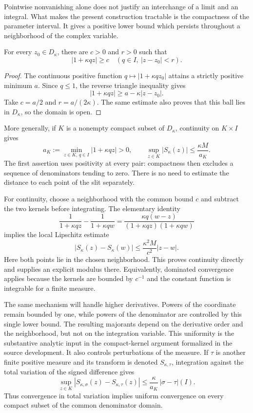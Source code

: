 \label{res:compact-control}
Pointwise nonvanishing alone does not justify an interchange of a limit
and an integral. What makes the present construction tractable is the
compactness of the parameter interval. It gives a positive lower bound
which persists throughout a neighborhood of the complex variable.

\begin{lemma}
For every $z_0\in D_\kappa$, there are $c>0$ and $r>0$ such that
\[
 |1+\kappa qz|\ge c
 \quad(q\in I,\ |z-z_0|<r).
\]
\end{lemma}
\begin{proof}
The continuous positive function $q\mapsto|1+\kappa qz_0|$ attains a
strictly positive minimum $a$. Since $q\le1$, the reverse triangle
inequality gives
\[
 |1+\kappa qz|\ge a-\kappa|z-z_0|.
\]
Take $c=a/2$ and $r=a/(2\kappa)$. The same estimate also proves that this
ball lies in $D_\kappa$, so the domain is open.
\end{proof}

More generally, if $K$ is a nonempty compact subset of $D_\kappa$,
continuity on $K\times I$ gives
\[
 a_K:=\min_{z\in K,\,q\in I}|1+\kappa qz|>0,
 \qquad \sup_{z\in K}|S_\kappa(z)|\le\frac{\kappa M}{a_K}.
\]
The first assertion uses positivity at every pair: compactness then
excludes a sequence of denominators tending to zero. There is no need
to estimate the distance to each point of the slit separately.

For continuity, choose a neighborhood with the common bound $c$ and
subtract the two kernels before integrating. The elementary identity
\[
 \frac1{1+\kappa qz}-\frac1{1+\kappa qw}
 =\frac{\kappa q(w-z)}{(1+\kappa qz)(1+\kappa qw)}
\]
implies the local Lipschitz estimate
\[
 |S_\kappa(z)-S_\kappa(w)|\le\frac{\kappa^2M}{c^2}|z-w|.
\]
Here both points lie in the chosen neighborhood. This proves continuity
directly and supplies an explicit modulus there. Equivalently, dominated
convergence applies because the kernels are bounded by $c^{-1}$ and the
constant function is integrable for a finite measure.

The same mechanism will handle higher derivatives. Powers of the
coordinate remain bounded by one, while powers of the denominator are
controlled by this single lower bound. The resulting majorants depend
on the derivative order and the neighborhood, but not on the integration
variable. This uniformity is the substantive analytic input in the
compact-kernel argument formalized in the source development.
It also controls perturbations of the measure. If $\tau$ is another
finite positive measure and its transform is denoted $S_{\kappa,\tau}$,
integration against the total variation of the signed difference gives
\[
 \sup_{z\in K}|S_{\kappa,\sigma}(z)-S_{\kappa,\tau}(z)|
 \le\frac{\kappa}{a_K}\,|\sigma-\tau|(I).
\]
Thus convergence in total variation implies uniform convergence on
every compact subset of the common denominator domain.

